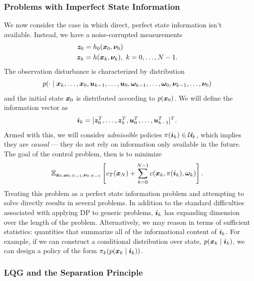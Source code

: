 \subsubsection{Problems with Imperfect State Information}

We now consider the case in which direct, perfect state information isn't available. Instead, we have a noise-corrupted measurements
\begin{align}
    \bm{z}_0 &= h_0(\bm{x}_0, \bm{\nu}_{0})\\
    \bm{z}_{k} &= h(\bm{x}_k, \bm{\nu}_{k}), \,\, k=0,\ldots,N-1.
\end{align}
The observation disturbance is characterized by distribution 
\begin{equation}
    p(\cdot\mid \bm{x}_k,\ldots,\bm{x}_0,\bm{u}_{k-1},\ldots,\bm{u}_0,\bm{\omega}_{k-1},\ldots,\bm{\omega}_{0},\bm{\nu}_{k-1},\ldots,\bm{\nu}_{0})
\end{equation}
and the initial state $\bm{x}_0$ is distributed according to $p(\bm{x}_0)$. We will define the information vector as
\begin{equation}
    \bm{i}_k = [\bm{z}_0^T, \ldots, \bm{z}_k^T, \bm{u}_0^T, \ldots, \bm{u}_{k-1}^T]^T.
\end{equation}
Armed with this, we will consider \textit{admissible} policies $\pi(\bm{i}_k) \in \mathcal{U}_k$, which implies they are \textit{causal} --- they do not rely on information only available in the future. The goal of the control problem, then is to minimize 
\begin{equation}
    \mathbb{E}_{\bm{x}_{0},\bm{\omega}_{0:N-1},\bm{\nu}_{0:N-1}} \left[ c_T(\bm{x}_N) + \sum_{k=0}^{N-1} c(\bm{x}_k, \pi(\bm{i}_k),\bm{\omega}_{k}) \right].
\end{equation}
Treating this problem as a perfect state information problem and attempting to solve directly results in several problems. In addition to the standard difficulties associated with applying DP to generic problems, $\bm{i}_k$ has expanding dimension over the length of the problem. Alternatively, we may reason in terms of sufficient statistics: quantities that summarize all of the informational content of $\bm{i}_k$. For example, if we can construct a conditional distribution over state, $p(\bm{x}_k\mid\bm{i}_k)$, we can design a policy of the form $\pi_k(p(\bm{x}_k\mid\bm{i}_k))$.

\subsubsection{LQG and the Separation Principle}

